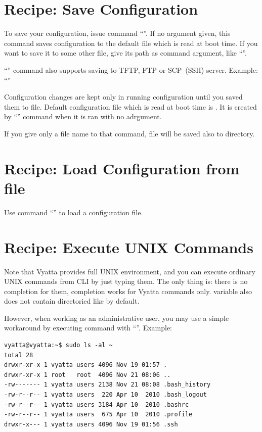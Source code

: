 \section{Recipe: Save Configuration}
\solution
To save your configuration, issue command ``''. If no argument given, this command saves configuration
to the default file which is read at boot time. If you want to save it to some other file, give its path as
command argument, like ``''.

``'' command also supports saving to TFTP, FTP or SCP~(SSH) server. Example: 
``''

\discussion
Configuration changes are kept only in running configuration until you saved them to file. Default configuration
file which is read at boot time is . It is created by 
``'' command when it is ran with no adrgument.

If you give only a file name to that command, file will be saved also to  
directory.

\section{Recipe: Load Configuration from file}
\solution
Use command ``'' to load a configuration file.

\section{Recipe: Execute UNIX Commands}
\solution
Note that Vyatta provides full UNIX environment, and you can execute ordinary UNIX commands from CLI by just typing
them. The only thing is: there is no completion for them, completion works for Vyatta commands only. 
 variable also does not contain directoried like  by default.

However, when working as an administrative user, you may use a simple workaround by executing command with
``''. Example:
\begin{verbatim}
vyatta@vyatta:~$ sudo ls -al ~
total 28
drwxr-xr-x 1 vyatta users 4096 Nov 19 01:57 .
drwxr-xr-x 1 root   root  4096 Nov 21 08:06 ..
-rw------- 1 vyatta users 2138 Nov 21 08:08 .bash_history
-rw-r--r-- 1 vyatta users  220 Apr 10  2010 .bash_logout
-rw-r--r-- 1 vyatta users 3184 Apr 10  2010 .bashrc
-rw-r--r-- 1 vyatta users  675 Apr 10  2010 .profile
drwxr-x--- 1 vyatta users 4096 Nov 19 01:56 .ssh
\end{verbatim}
